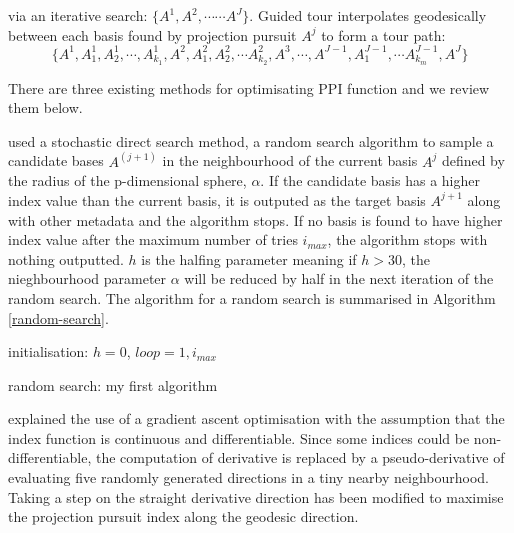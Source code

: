 \documentclass[12pt]{article}
\begin{document}
via an iterative search: \(\{A^1, A^2, \cdots \cdots A^J\}\). Guided
tour interpolates geodesically between each basis found by projection
pursuit \(A^j\) to form a tour path:
\[\{A^1, A^1_1, A^1_2,\cdots, A^1_{k_1}, A^2, A^2_1, A^2_2, \cdots A^2_{k_2}, A^3, \cdots, A^{J-1}, A^{J-1}_{1}, \cdots A^{J-1}_{k_m} ,A^J  \}\]

There are three existing methods for optimisating PPI function and we
review them below.

\citet{posse1995projection} used a stochastic direct search method, a
random search algorithm to sample a candidate bases \(A^{(j +1)}\) in
the neighbourhood of the current basis \(A^j\) defined by the radius of
the p-dimensional sphere, \(\alpha\). If the candidate basis has a
higher index value than the current basis, it is outputed as the target
basis \(A^{j + 1}\) along with other metadata and the algorithm stops.
If no basis is found to have higher index value after the maximum number
of tries \(i_{max}\), the algorithm stops with nothing outputted. \(h\)
is the halfing parameter meaning if \(h > 30\), the nieghbourhood
parameter \(\alpha\) will be reduced by half in the next iteration of
the random search. The algorithm for a random search is summarised in
Algorithm \ref{random-search}.

\newpage
\begin{algorithm}[H]
\SetAlgoLined
  initialisation: $h = 0$, $loop = 1, i_{max}$\;
  \caption{random search: my first algorithm}
  \label{random-search}
\end{algorithm}

\citet{cook1995grand} explained the use of a gradient ascent
optimisation with the assumption that the index function is continuous
and differentiable. Since some indices could be non-differentiable, the
computation of derivative is replaced by a pseudo-derivative of
evaluating five randomly generated directions in a tiny nearby
neighbourhood. Taking a step on the straight derivative direction has
been modified to maximise the projection pursuit index along the
geodesic direction.
\end{document}
